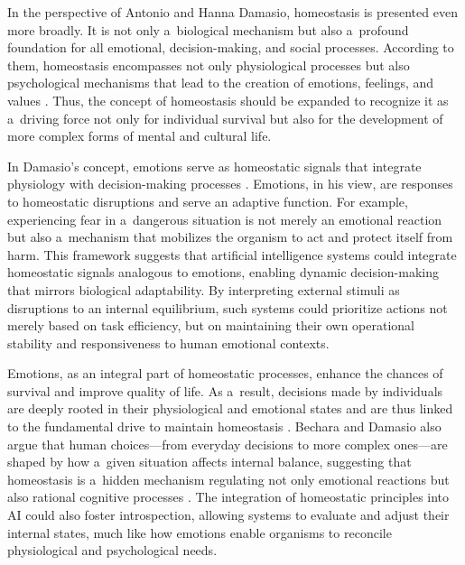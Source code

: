 \documentclass[%
  manuscript=article,
  year=2024,
  volume=77,
  doi=10.59203/zfn.77.706,
]{zfn}
\begin{document}
In the perspective of Antonio and Hanna Damasio, homeostasis is presented even more broadly. It is not only a~biological mechanism but also a~profound foundation for all emotional, decision-making, and social processes. According to them, homeostasis encompasses not only physiological processes but also psychological mechanisms that lead to the creation of emotions, feelings, and values 
\parencites[][]{korn_maintaining_2015}[][]{damasio_homeostatic_2022}. %
 Thus, the concept of homeostasis should be expanded to recognize it as a~driving force not only for individual survival but also for the development of more complex forms of mental and cultural life.



In Damasio's concept, emotions serve as homeostatic signals that integrate physiology with decision-making processes 
\parencite[][]{damasio_nature_2013}. %
 Emotions, in his view, are responses to homeostatic disruptions and serve an adaptive function. For example, experiencing fear in a~dangerous situation is not merely an emotional reaction but also a~mechanism that mobilizes the organism to act and protect itself from harm. This framework suggests that artificial intelligence systems could integrate homeostatic signals analogous to emotions, enabling dynamic decision-making that mirrors biological adaptability. By interpreting external stimuli as disruptions to an internal equilibrium, such systems could prioritize actions not merely based on task efficiency, but on maintaining their own operational stability and responsiveness to human emotional contexts.



Emotions, as an integral part of homeostatic processes, enhance the chances of survival and improve quality of life. As a~result, decisions made by individuals are deeply rooted in their physiological and emotional states and are thus linked to the fundamental drive to maintain homeostasis 
\parencite[][]{burdakov_reactive_2019}. %
 Bechara and Damasio also argue that human choices---from everyday decisions to more complex ones---are shaped by how a~given situation affects internal balance, suggesting that homeostasis is a~hidden mechanism regulating not only emotional reactions but also rational cognitive processes 
\parencite[][]{bechara_emotion_2000}. %
 The integration of homeostatic principles into AI could also foster introspection, allowing systems to evaluate and adjust their internal states, much like how emotions enable organisms to reconcile physiological and psychological needs.
\end{document}

